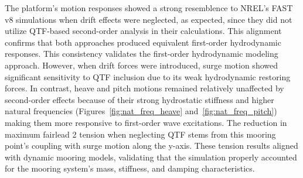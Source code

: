 \documentclass[a4paper, 11pt]{article}
\begin{document}
The platform's motion responses showed a strong resemblence to NREL's FAST v8 simulations when drift effects were neglected, as expected, since they did not utilize QTF-based second-order analysis in their calculations. This alignment confirms that both approaches produced equivalent first-order hydrodynamic responses. This consistency validates the first-order hydrodynamic modeling approach. However, when drift forces were introduced, surge motion showed significant sensitivity to QTF inclusion due to its weak hydrodynamic restoring forces. In contrast, heave and pitch motions remained relatively unaffected by second-order effects because of their strong hydrostatic stiffness and higher natural frequencies (Figures~\ref{fig:nat_freq_heave} and~\ref{fig:nat_freq_pitch}) making them more responsive to first-order wave excitations. The reduction in maximum fairlead 2 tension when neglecting QTF stems from this mooring point's  coupling with surge motion along the y-axis. These tension results aligned with dynamic mooring models, validating that the simulation properly accounted for the mooring system's mass, stiffness, and damping characteristics.
\end{document}
